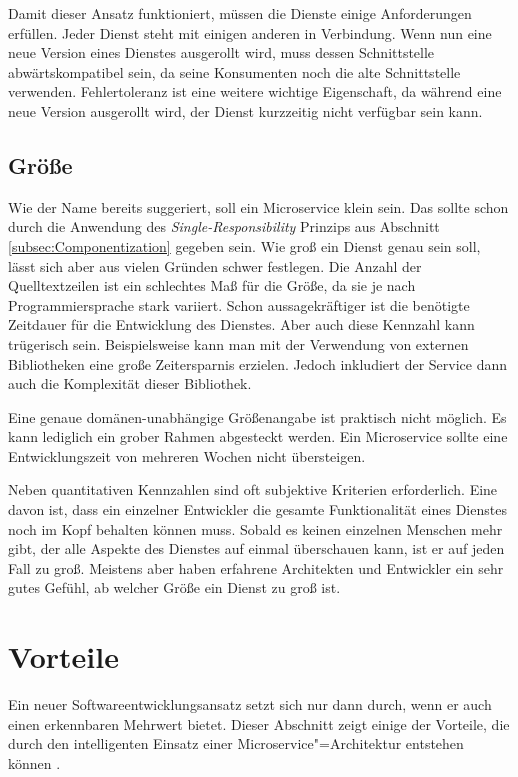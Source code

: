 Damit dieser Ansatz funktioniert, müssen die Dienste einige Anforderungen erfüllen. Jeder Dienst steht mit einigen anderen in Verbindung. Wenn nun eine neue Version eines Dienstes ausgerollt wird, muss dessen Schnittstelle abwärtskompatibel sein, da seine Konsumenten noch die alte Schnittstelle verwenden. Fehlertoleranz ist eine weitere wichtige Eigenschaft, da während eine neue Version ausgerollt wird, der Dienst kurzzeitig nicht verfügbar sein kann.

\subsection{Größe}

Wie der Name bereits suggeriert, soll ein Microservice klein sein. Das sollte schon durch die Anwendung des \textit{Single-Responsibility} Prinzips aus Abschnitt \ref{subsec:Componentization} gegeben sein. Wie groß ein Dienst genau sein soll, lässt sich aber aus vielen Gründen schwer festlegen. Die Anzahl der Quelltextzeilen ist ein schlechtes Maß für die Größe, da sie je nach Programmiersprache stark variiert. Schon aussagekräftiger ist die benötigte Zeitdauer für die Entwicklung des Dienstes. Aber auch diese Kennzahl kann trügerisch sein. Beispielsweise kann man mit der Verwendung von externen Bibliotheken eine große Zeitersparnis erzielen. Jedoch inkludiert der Service dann auch die Komplexität dieser Bibliothek.

Eine genaue domänen-unabhängige Größenangabe ist praktisch nicht möglich. Es kann lediglich ein grober Rahmen abgesteckt werden. Ein Microservice sollte eine Entwicklungszeit von mehreren Wochen nicht übersteigen.

Neben quantitativen Kennzahlen sind oft subjektive Kriterien erforderlich. Eine davon ist, dass ein einzelner Entwickler die gesamte Funktionalität eines Dienstes noch im Kopf behalten können muss. Sobald es keinen einzelnen Menschen mehr gibt, der alle Aspekte des Dienstes auf einmal überschauen kann, ist er auf jeden Fall zu groß. Meistens aber haben erfahrene Architekten und Entwickler ein sehr gutes Gefühl, ab welcher Größe ein Dienst zu groß ist.

\section{Vorteile}
\label{sec:ms-advantages}

Ein neuer Softwareentwicklungsansatz setzt sich nur dann durch, wenn er auch einen erkennbaren Mehrwert bietet. Dieser Abschnitt zeigt einige der Vorteile, die durch den intelligenten Einsatz einer Microservice"=Architektur entstehen können \cite{fowlerMSTradeOffs,newman2015building}.

